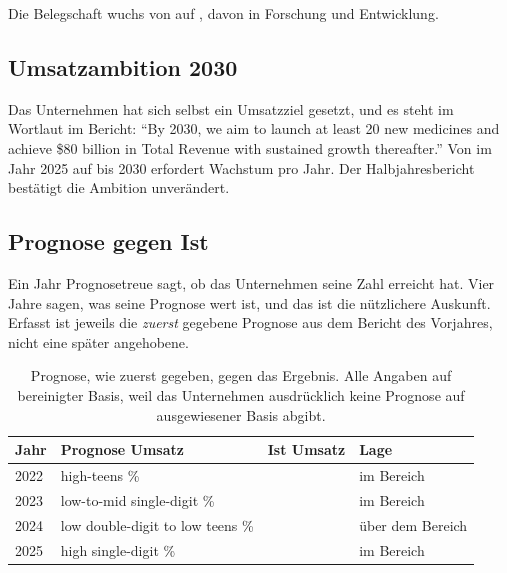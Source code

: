 Die Belegschaft wuchs von \Stueck{\AznMitarbeiterVJ} auf
\Stueck{\AznMitarbeiter}, davon \Stueck{\AznMitarbeiterFuE} in Forschung und
Entwicklung.

\subsection{Umsatzambition 2030}

Das Unternehmen hat sich selbst ein Umsatzziel gesetzt, und es steht im
Wortlaut im Bericht: \enquote{By 2030, we aim to launch at least 20 new
medicines and achieve \$80 billion in Total Revenue with sustained growth
thereafter.}
Von \MioUSD{\AznUmsatzXXV} im Jahr 2025 auf \MrdUSD{\AznAmbition} bis 2030
erfordert \Pct{\AznAmbitionRate} Wachstum pro Jahr. Der Halbjahresbericht
best\"atigt die Ambition unver\"andert.

\subsection{Prognose gegen Ist}
\label{sec:prognose-azn}

Ein Jahr Prognosetreue sagt, ob das Unternehmen seine Zahl erreicht hat. Vier
Jahre sagen, was seine Prognose wert ist, und das ist die n\"utzlichere
Auskunft. Erfasst ist jeweils die \emph{zuerst} gegebene Prognose aus dem
Bericht des Vorjahres, nicht eine sp\"ater angehobene.

\begin{table}[htbp]
\centering
\caption{Prognose, wie zuerst gegeben, gegen das Ergebnis. Alle Angaben auf
bereinigter Basis, weil das Unternehmen ausdr\"ucklich keine Prognose auf
ausgewiesener Basis abgibt.}
\label{tab:azn-prognose}
\begin{tabular}{llll}
\toprule
Jahr & Prognose Umsatz & Ist Umsatz & Lage\\
\midrule
2022 & high-teens \%              & \Pct{\AznIstXXII} & im Bereich\\
2023 & low-to-mid single-digit \% & \Pct{\AznIstXXIII} & im Bereich\\
2024 & low double-digit to low teens \% & \Pct{\AznIstXXIV} & \"uber dem Bereich\\
2025 & high single-digit \%       & \Pct{\AznIstXXV} & im Bereich\\
\bottomrule
\end{tabular}
\end{table}

